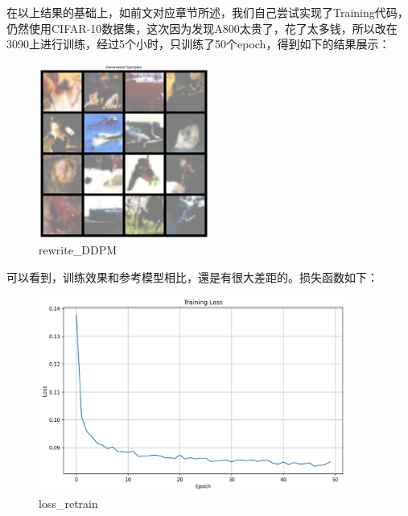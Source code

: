 \documentclass{ctexart}
\begin{document}
在以上结果的基础上，如前文对应章节所述，我们自己尝试实现了Training代码，仍然使用CIFAR-10数据集，这次因为发现A800太贵了，花了太多钱，所以改在3090上进行训练，经过5个小时，只训练了50个epoch，得到如下的结果展示：
\begin{figure}[H]
     \centering
     \includegraphics[width=0.5\textwidth]{epoch_50_samples_retrain.png}
     \caption{rewrite\_DDPM}
     \label{fig:rewrite_ddpm}  %
\end{figure}

可以看到，训练效果和参考模型相比，還是有很大差距的。损失函数如下：
\begin{figure}[H]
     \centering
     \includegraphics[width=0.9\textwidth]{loss_retrain.png}
     \caption{loss\_retrain}
     \label{fig:loss_retrain}  %
\end{figure}
\end{document}
